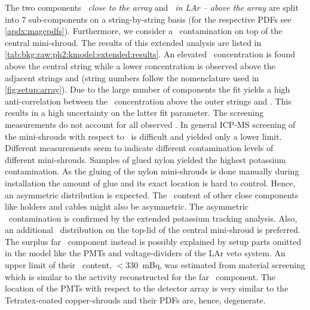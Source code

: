 The two components \emph{\kvn\ close to the array} and \emph{\kvz\ in LAr -- above the
array} are split into 7 sub-components on a string-by-string basis (for the respective
PDFs see \cref{apdx:magepdfs}). Furthermore, we consider a \kvn\ contamination on top
of the central mini-shroud.
\newpar
The results of this extended analysis are listed in
\cref{tab:bkg:raw:ph2:kmodel:extended:results}. An elevated \kvz\ concentration is found
above the central string while a lower concentration is observed above the adjacent
strings  and  (string numbers follow the nomenclature used in
\cref{fig:setup:array}). Due to the large number of components the fit yields a high
anti-correlation between the \kvz\ concentration above the outer strings and . This
results in a high uncertainty on the latter fit parameter.
\newpar
The screening measurements do not account for all observed \kvn. In general ICP-MS
screening of the mini-shrouds with respect to \kvn\ is difficult and yielded only a lower
limit. Different measurements seem to indicate different contamination levels of different
mini-shrouds.  Samples of glued nylon yielded the highest potassium contamination. As the
gluing of the nylon mini-shrouds is done manually during installation the amount of glue
and its exact location is hard to control. Hence, an asymmetric distribution is expected.
The \kvn\ content of other close components like holders and cables might also be
asymmetric. The asymmetric \kvn\ contamination is confirmed by the extended potassium
tracking analysis. Also, an additional \kvn\ distribution on the top-lid of the central
mini-shroud is preferred.  The surplus far \kvn\ component instead is possibly explained
by setup parts omitted in the model like the PMTs and voltage-dividers of the LAr veto
system. An upper limit of their \kvn\ content, $<330$~mBq, was estimated from material
screening which is similar to the activity reconstructed for the far \kvn\ component. The
location of the PMTs with respect to the detector array is very similar to the
Tetratex\reg-coated copper-shrouds and their PDFs are, hence, degenerate.

\begin{table}
  \centering
  \caption{%
    Summary of the fit parameters estimated with the potassium source tracking analysis
    (extended model). The type of prior distribution is indicated with \m{[f]}: flat,
    \m{[g]}: Gaussian. ($\,^{\dagger}$ Tetratex\reg-coated)
  }\label{tab:bkg:raw:ph2:kmodel:extended:results}
  
\end{table}

